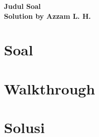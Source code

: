 %
%
%
%
%

\begin{center}
    {\color{crimson}\textbf{\Huge Judul Soal}}\\[4pt]
    {\color{inksoft}\textbf{\large Solution by Azzam L. H.}}
\end{center}

\section{Soal}


\newpage
\section{Walkthrough}


\newpage
\section{Solusi}
